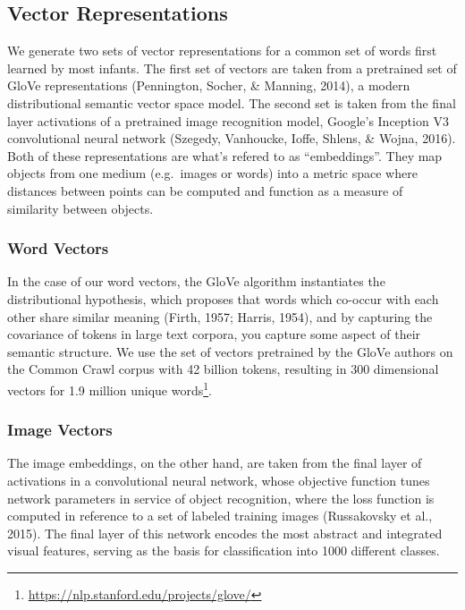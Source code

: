 \documentclass[10pt, letterpaper]{article}
\begin{document}
\subsection{Vector Representations}\label{vector-representations}

We generate two sets of vector representations for a common set of words
first learned by most infants. The first set of vectors are taken from a
pretrained set of GloVe representations (Pennington, Socher, \& Manning,
2014), a modern distributional semantic vector space model. The second
set is taken from the final layer activations of a pretrained image
recognition model, Google's Inception V3 convolutional neural network
(Szegedy, Vanhoucke, Ioffe, Shlens, \& Wojna, 2016). Both of these
representations are what's refered to as ``embeddings''. They map
objects from one medium (e.g.~images or words) into a metric space where
distances between points can be computed and function as a measure of
similarity between objects.

\subsubsection{Word Vectors}\label{word-vectors}

In the case of our word vectors, the GloVe algorithm instantiates the
distributional hypothesis, which proposes that words which co-occur with
each other share similar meaning (Firth, 1957; Harris, 1954), and by
capturing the covariance of tokens in large text corpora, you capture
some aspect of their semantic structure. We use the set of vectors
pretrained by the GloVe authors on the Common Crawl corpus with 42
billion tokens, resulting in 300 dimensional vectors for 1.9 million
unique words\footnote{\url{https://nlp.stanford.edu/projects/glove/}}.

\subsubsection{Image Vectors}\label{image-vectors}

The image embeddings, on the other hand, are taken from the final layer
of activations in a convolutional neural network, whose objective
function tunes network parameters in service of object recognition,
where the loss function is computed in reference to a set of labeled
training images (Russakovsky et al., 2015). The final layer of this
network encodes the most abstract and integrated visual features,
serving as the basis for classification into 1000 different classes.
\end{document}
